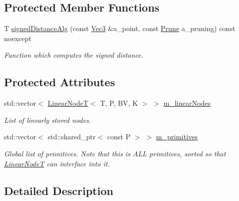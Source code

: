 \subsection*{Protected Member Functions}
\begin{DoxyCompactItemize}
\item 
T \hyperlink{classBVH_1_1LinearBVH_a9eef70c91c5ba2608721ff3e3cb2cf56}{signed\+Distance\+Alg} (const \hyperlink{classBVH_1_1LinearBVH_a13b0083e8b7ff1a5e170d39d69e6a15a}{Vec3} \&a\+\_\+point, const \hyperlink{namespaceBVH_a3ddb7b34ac1deb3baed2f32d9eacbe5b}{Prune} a\+\_\+pruning) const noexcept
\begin{DoxyCompactList}\small\item\em Function which computes the signed distance. \end{DoxyCompactList}\end{DoxyCompactItemize}
\subsection*{Protected Attributes}
\begin{DoxyCompactItemize}
\item 
\mbox{\label{classBVH_1_1LinearBVH_aa6b833445964d75b5b560ece4548a044}} 
std\+::vector$<$ \hyperlink{classBVH_1_1LinearNodeT}{Linear\+NodeT}$<$ T, P, BV, K $>$ $>$ \hyperlink{classBVH_1_1LinearBVH_aa6b833445964d75b5b560ece4548a044}{m\+\_\+linear\+Nodes}
\begin{DoxyCompactList}\small\item\em List of linearly stored nodes. \end{DoxyCompactList}\item 
\mbox{\label{classBVH_1_1LinearBVH_aa4f627615c40d7230139ec1744384322}} 
std\+::vector$<$ std\+::shared\+\_\+ptr$<$ const P $>$ $>$ \hyperlink{classBVH_1_1LinearBVH_aa4f627615c40d7230139ec1744384322}{m\+\_\+primitives}
\begin{DoxyCompactList}\small\item\em Global list of primitives. Note that this is A\+LL primitives, sorted so that \hyperlink{classBVH_1_1LinearNodeT}{Linear\+NodeT} can interface into it. \end{DoxyCompactList}\end{DoxyCompactItemize}


\subsection{Detailed Description}

